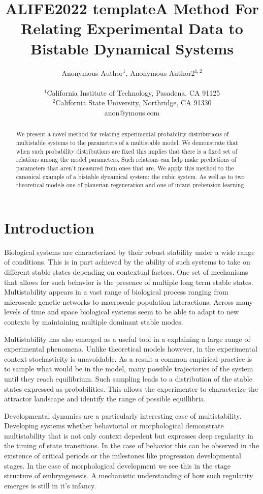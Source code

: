 \documentclass[letterpaper]{article}
\title{ALIFE2022 template}
\title{A Method For Relating Experimental Data to Bistable Dynamical Systems}
\author{Anonymous Author$^{1}$, Anonymous Author2$^{1,2}$ \\
\mbox{}\\
$^1$California Institute of Technology, Pasadena, CA 91125 \\
$^2$California State University, Northridge, CA 91330 \\
anon@ymous.com} %
\begin{document}
\maketitle

\begin{abstract}
    We present a novel method for relating experimental probability
    distributions of multistable systems to the parameters of a
    multistable model. We demonstrate that when such probability 
    distributions are fixed this implies that there is a fixed
    set of relations among the model parameters. Such relations 
    can help make predictions of parameters that aren't measured
    from ones that are. We apply this method
    to the canonical example of a bistable dynamical system: the cubic
    system.
    As well as to two theoretical models one of planerian regeneration
    and one of infant prehension learning.
\end{abstract}

\section{Introduction}
Biological systems are characterized by their robust stability under
a wide range of conditions. This is in part achieved by the ability
of such systems to take on different stable states
depending on contextual factors. One set of mechanisms that allows for such 
behavior is the presence of multiple long term stable states. Multistability
appears in a vast range of biological process ranging from microscale
genetic networks to macroscale population interactions. Across many levels 
of time and space biological systems seem to be able to adapt to new contexts
by maintaining multiple dominant stable modes.

Multistability has also
emerged as a useful tool in a explaining a large range of experimental phenomena.
Unlike theoretical models however, in the experimental context stochasticity
is unavoidable. As a result a common empirical practice is to sample what 
would be in the model, many possible trajectories of the system until they
reach equilibrium. 
Such sampling leads to a distribution of the stable states expressed as 
probabilities. This allows the experimenter to characterize the attractor
landscape and identify the range of possible equillibria.

Developmental dynamics are a particularly interesting case of multistability. 
Developing systems whether behaviorial or morphological demonstrate multistability 
that is not only context depedent but expresses deep regularity in the timing of 
state transitions. In the case of behavior this can be observed in the existence
of critical periods or the milestones like progression developmental stages. 
In the case of morphological development we see this in the stage structure of
embryogenesis. A mechanistic understanding of how such regularity emerges is 
still in it's infancy.
\end{document}
